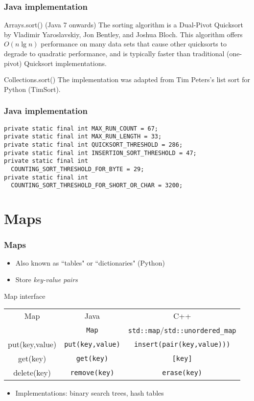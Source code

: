 \documentclass{beamer}
\begin{document}
\begin{frame}
 \frametitle{Java implementation}
 \begin{block}{Arrays.sort() (Java 7 onwards)}
The sorting algorithm is a Dual-Pivot Quicksort by Vladimir
Yaroslavskiy, Jon Bentley, and Joshua Bloch. This algorithm offers
$O(n \lg n)$ performance on many data sets that cause other quicksorts
to degrade to quadratic performance, and is typically faster than
traditional (one-pivot) Quicksort implementations.
 \end{block}
 \begin{block}{Collections.sort()}
The implementation was adapted from Tim Peters's list sort for Python
(TimSort).
 \end{block}
\end{frame}

\begin{frame}[fragile]
 \frametitle{Java implementation}
 \begin{verbatim}
private static final int MAX_RUN_COUNT = 67;
private static final int MAX_RUN_LENGTH = 33;
private static final int QUICKSORT_THRESHOLD = 286;
private static final int INSERTION_SORT_THRESHOLD = 47;
private static final int
  COUNTING_SORT_THRESHOLD_FOR_BYTE = 29;
private static final int
  COUNTING_SORT_THRESHOLD_FOR_SHORT_OR_CHAR = 3200;
 \end{verbatim}
\end{frame}

\section{Maps}

\begin{frame}
 \frametitle{Maps}
 \begin{itemize}
  \item Also known as ``tables" or ``dictionaries" (Python)
  \item Store \emph{key-value pairs}
 \end{itemize}
 \begin{center}
 Map interface \\
 \vspace{0.5cm}
 \begin{tabular}{c|c|c}
  Map & Java & C++ \\
  & \texttt{Map} & \texttt{std::map}/\texttt{std::unordered\_map} \\
  \hline
  put(key,value) & \texttt{put(key,value)} & \texttt{insert(pair(key,value)))} \\
  get(key) & \texttt{get(key)} & \texttt{[key]} \\
  delete(key) & \texttt{remove(key)} & \texttt{erase(key)} \\
 \end{tabular}
 \end{center}
 \begin{itemize}
  \item Implementations: binary search trees, hash tables
 \end{itemize}
\end{frame}
\end{document}
